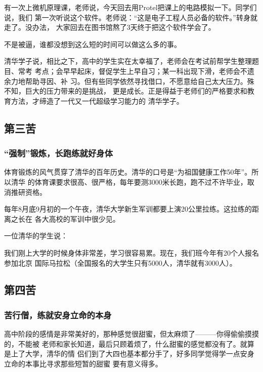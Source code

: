 \documentclass[11pt]{ctexart}
\begin{document}
{{{{有一次上微机原理课，老师说，今天回去用Protel把课上的电路模拟一下。同学们说，我们
第一次听说这个软件。老师说：“这是电子工程人员必备的软件。”转身就走了。没办法，
大家回去在图书馆熬了3天终于把这个软件学会了。

不是被逼，谁都没想到这么短的时间可以做这么多的事。

清华学子说，相比之下，高中的学生实在太幸福了，老师会在考试前帮学生整理题目、常考
考点；会早早起床，督促学生上早自习；某一科出现下滑，老师会不遗余力地帮助寻因、补
习。但有些同学依然寻找借口，不愿意给自己太大压力。殊不知，巨大的压力带来的是挑战，
更是成长。正是得益于老师们的严格要求和教育方法，才缔造了一代又一代超级学习能力的
清华学子。

\subsection{第三苦}
\label{sec:orgfd7d3e1}

\subsubsection{“强制”锻炼，长跑练就好身体}
\label{sec:orge0f1f0c}

体育锻炼的风气贯穿了清华的百年历史。清华的口号是“为祖国健康工作50年”。所以清华
的体育课要求很高、很严格，每年要测3000米长跑，跑不过不许毕业，取消推研资格。

每年8月底9月初的一个午夜，清华大学新生军训都要上演20公里拉练。这拉练的距离之长在
各大高校的军训中很少见。

一位清华的学生说：

我们刚上大学的时候身体非常差，学习很容易累。现在，我们班今年有20个人报名参加北京
国际马拉松（全国报名的大学生只有5000人，清华就有3000人）。

\subsection{第四苦}
\label{sec:org044e5be}

\subsubsection{苦行僧，练就安身立命的本身}
\label{sec:orgac8a55f}

高中阶段的感情是非常美好的，那种感觉很甜蜜，但太麻烦了———你得偷偷摸摸的，不能被
老师和家长知道，最后只顾着烦了，什么甜蜜的感觉都没有了。就算是上了大学，清华的情
侣们到了大四也基本都分手了，好多同学觉得学一点安身立命的本事比寻求那些短暂的甜蜜
要有意义得多。

}}}}
\end{document}
